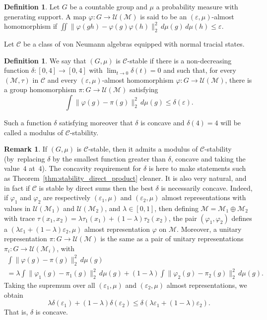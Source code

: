 \documentclass[10pt]{amsart}
\theoremstyle{plain}
\theoremstyle{definition}
\newtheorem{definition}[theorem]{Definition}
\newtheorem{remark}[theorem]{Remark}
\newcommand{\cM}{\mathcal{M}}
\newcommand{\vn}{\mathcal{C}}
\newcommand{\cU}{\mathcal{U}}
\numberwithin{equation}{section}
\begin{document}
\begin{definition} Let $G$ be a countable group and $\mu$ a probability measure with generating support. A map $\varphi:G\to \cU(\cM)$ is said to be an $(\varepsilon,\mu)$-almost homomorphism if $\iint \| \varphi(gh) - \varphi(g) \varphi(h)\|_2^2\,d\mu(g) \,d\mu(h) \leq \varepsilon$.
\end{definition}
Let $\vn$ be a class of von Neumann algebras equipped with normal tracial states.

\begin{definition}\label{def:stability}
We say that $(G,\mu)$ is $\vn$-stable if there is a non-decreasing
function $\delta:[0,4]\to [0,4]$ with $\lim_{t \to 0} \delta(t)= 0$ and such that, for every $(\cM,\tau)$ in $\vn$ and every $(\varepsilon,\mu)$-almost homomorphism $\varphi: G \to \cU(\cM)$, there is a group homomorphism $\pi:G \to
\cU(\cM)$ satisfying
\[
\int \|\varphi(g) - \pi(g)\|_2^2 \,d\mu(g) \leq \delta(\varepsilon).
\]

Such a function $\delta$ satisfying moreover that $\delta$ is concave and $\delta(4)= 4$ will be called a modulus of $\vn$-stability.
\end{definition}
\begin{remark} If $(G,\mu)$ is $\vn$-stable, then it admits a modulus of $\vn$-stability (by~replacing $\delta$ by the smallest function greater than $\delta$, concave and taking the value~$4$ at~$4$). The concavity requirement for $\delta$ is here to make statements such as Theorem~\ref{thm:stability_direct_product} cleaner. It is also very natural, and in fact if $\vn$ is stable by direct sums then the best $\delta$ is necessarily concave. Indeed, if $\varphi_1$ and $\varphi_2$ are respectively $(\varepsilon_1,\mu)$ and $(\varepsilon_2,\mu)$ almost representations with values in $\cU(\cM_1)$ and $\cU(\cM_2)$, and $\lambda \in [0,1]$, then defining $\cM = \cM_1\oplus \cM_2$ with trace $\tau(x_1,x_2) = \lambda \tau_1(x_1) + (1-\lambda)\tau_2(x_2)$, the pair $(\varphi_1,\varphi_2)$ defines a $(\lambda\varepsilon_1+(1-\lambda)\varepsilon_2,\mu)$ almost representation $\varphi$ on $\cM$. Moreover, a unitary representation $\pi:G\to \cU(\cM)$ is the same as a pair of unitary representations $\pi_i:G\to \cU(\cM_i)$, with
\begin{multline*} \int \|\varphi(g) - \pi(g)\|_2^2 \,d\mu(g) \\=\lambda \int \|\varphi_1(g) - \pi_1(g)\|_2^2 \,d\mu(g) + (1-\lambda) \int \|\varphi_2(g) - \pi_2(g)\|_2^2 \,d\mu(g).
\end{multline*}
Taking the supremum over all $(\varepsilon_1,\mu)$ and $(\varepsilon_2,\mu)$ almost representations, we obtain
\[
\lambda\delta(\varepsilon_1) + (1-\lambda)\delta(\varepsilon_2) \leq \delta(\lambda\varepsilon_1+(1-\lambda)\varepsilon_2).
\]
That is, $\delta$ is concave.
\end{remark}
\end{document}
